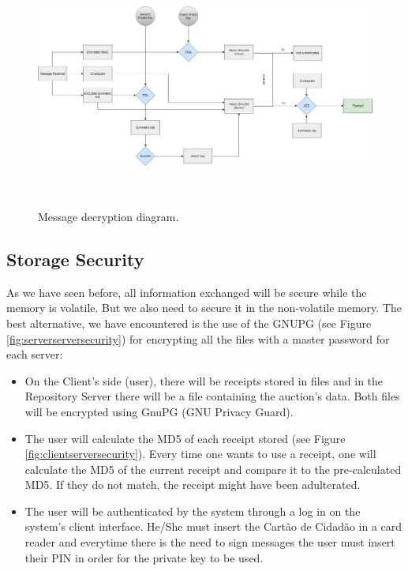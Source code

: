 \begin{figure}[H]
\center
\includegraphics[height=8cm]{sections/img/decryption.jpg}
\caption{Message decryption diagram.}
\label{fig:messagedecrypt}
\end{figure}

\vspace*{5mm}

\subsection{Storage Security}
As we have seen before, all information exchanged will be secure while the memory is volatile. But we also need to secure it in the non-volatile memory. The best alternative, we have encountered is the use of the GNUPG (see Figure \ref{fig:serverserversecurity}) for encrypting all the files with a master password for each server:
\begin{itemize}
    \item On the Client's side (user), there will be receipts stored in files and in the Repository Server there will be a file containing the auction's data. Both files will be encrypted using GnuPG (GNU Privacy Guard).
    \item The user will calculate the MD5 of each receipt stored (see Figure \ref{fig:clientserversecurity}). Every time one wants to use a receipt, one will calculate the MD5 of the current receipt and compare it to the pre-calculated MD5. If they do not match, the receipt might have been adulterated.
    \item The user will be authenticated by the system through a log in on the system's client interface. He/She must insert the Cartão de Cidadão in a card reader and everytime there is the need to sign messages the user must insert their PIN in order for the private key to be used.
\end{itemize}




